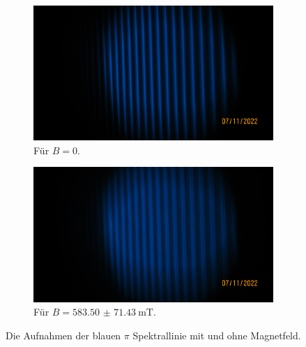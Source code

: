     \begin{figure}%
      \begin{subfigure}{0.48\textwidth}%
        \centering%
        \includegraphics[width=\textwidth]{pictures/IMG_0009.JPG}%
        \caption{Für $B = \num{0}$.}%
        \label{fig:pic_blaup_0}%
      \end{subfigure}%
      \hfill%
      \begin{subfigure}{0.48\textwidth}%
        \centering%
        \includegraphics[width=\textwidth]{pictures/IMG_0010.JPG}%
        \caption{Für $B = \SI{583.50(7143)}{\milli\tesla}$.}%
        \label{fig:pic_blaup_B}%
      \end{subfigure}%
      \caption{Die Aufnahmen der blauen $\pi$ Spektrallinie mit und ohne Magnetfeld.}%
      \label{fig:blaup}%
    \end{figure}

